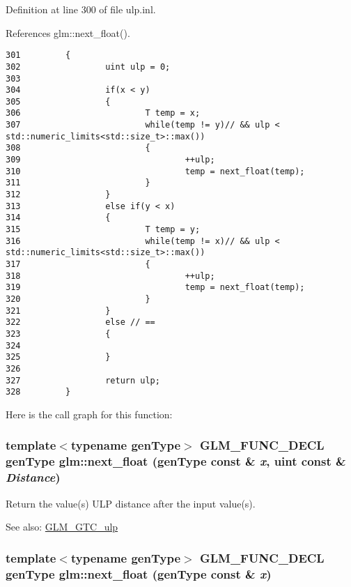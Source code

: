 Definition at line 300 of file ulp.inl.

References glm::next\_\-float().

\begin{Code}\begin{verbatim}301         {
302                 uint ulp = 0;
303 
304                 if(x < y)
305                 {
306                         T temp = x;
307                         while(temp != y)// && ulp < std::numeric_limits<std::size_t>::max())
308                         {
309                                 ++ulp;
310                                 temp = next_float(temp);
311                         }
312                 }
313                 else if(y < x)
314                 {
315                         T temp = y;
316                         while(temp != x)// && ulp < std::numeric_limits<std::size_t>::max())
317                         {
318                                 ++ulp;
319                                 temp = next_float(temp);
320                         }
321                 }
322                 else // ==
323                 {
324 
325                 }
326 
327                 return ulp;
328         }
\end{verbatim}
\end{Code}




Here is the call graph for this function:\hypertarget{group__gtc__ulp_g686013928fd7c76c5f100b84483b1f51}{
\subsubsection[next\_\-float]{\setlength{\rightskip}{0pt plus 5cm}template$<$typename genType$>$ GLM\_\-FUNC\_\-DECL genType glm::next\_\-float (genType const \& {\em x}, \/  uint const \& {\em Distance})}}
\label{group__gtc__ulp_g686013928fd7c76c5f100b84483b1f51}


Return the value(s) ULP distance after the input value(s). \begin{Desc}
\item[See also:]\hyperlink{group__gtc__ulp}{GLM\_\-GTC\_\-ulp} \end{Desc}
\hypertarget{group__gtc__ulp_g5ec4457d254b7b960db32f10d219fd6f}{
\subsubsection[next\_\-float]{\setlength{\rightskip}{0pt plus 5cm}template$<$typename genType$>$ GLM\_\-FUNC\_\-DECL genType glm::next\_\-float (genType const \& {\em x})}}
\label{group__gtc__ulp_g5ec4457d254b7b960db32f10d219fd6f}


